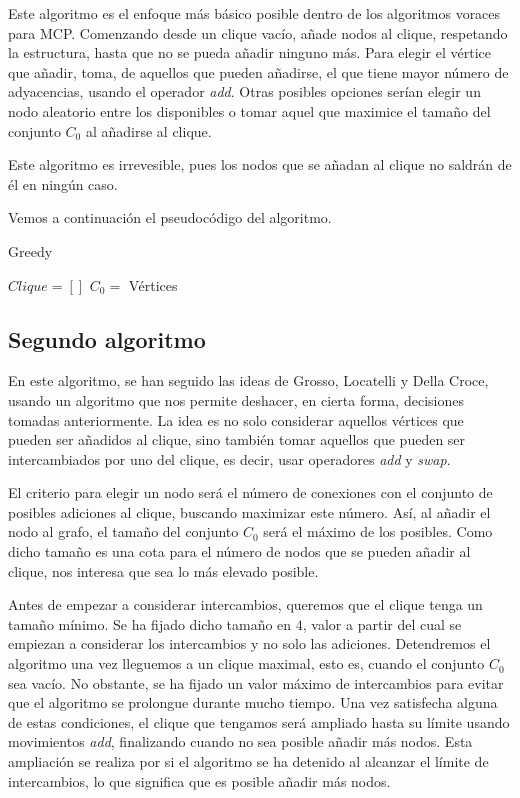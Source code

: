 Este algoritmo es el enfoque más básico posible dentro de los algoritmos voraces para MCP.
Comenzando desde un clique vacío, añade nodos al clique, respetando la estructura, hasta
que no se pueda añadir ninguno más. Para elegir el vértice que añadir, toma, de aquellos que
pueden añadirse, el que tiene mayor número de adyacencias, usando el operador \textit{add}.
Otras posibles opciones serían elegir un nodo aleatorio entre los disponibles o tomar aquel que
maximice el tamaño del conjunto $C_0$ al añadirse al clique.

Este algoritmo es irrevesible, pues los nodos que se añadan al clique no saldrán de él
en ningún caso.

Vemos a continuación el pseudocódigo del algoritmo.

\begin{algorithm}[H]
\caption{Greedy}
  \begin{algorithmic}
  \State $Clique = [ ]$
  \State $C_0 = $ Vértices
  \Repeat
  \end{algorithmic}
\end{algorithm}


\subsection{Segundo algoritmo}

En este algoritmo, se han seguido las ideas de Grosso, Locatelli y Della Croce, usando un algoritmo
que nos permite deshacer, en cierta forma, decisiones tomadas anteriormente. La idea es no solo
considerar aquellos vértices que pueden ser añadidos al clique, sino también tomar aquellos que
pueden ser intercambiados por uno del clique, es decir, usar operadores \textit{add} y \textit{swap}.

El criterio para elegir un nodo será el número de conexiones con el conjunto de posibles adiciones
al clique, buscando maximizar este número. Así, al añadir el nodo al grafo, el tamaño del conjunto
$C_0$ será el máximo de los posibles. Como dicho tamaño es una cota para el número de nodos que se
pueden añadir al clique, nos interesa que sea lo más elevado posible.

Antes de empezar a considerar intercambios, queremos que el clique tenga un tamaño mínimo.
Se ha fijado dicho tamaño en $4$, valor a partir del cual se empiezan a considerar los
intercambios y no solo las adiciones. Detendremos el algoritmo una vez lleguemos a un
clique maximal, esto es, cuando el conjunto $C_0$ sea vacío. No obstante, se ha fijado
un valor máximo de intercambios para evitar que el algoritmo se prolongue durante mucho tiempo.
Una vez satisfecha alguna de estas condiciones, el clique que tengamos será ampliado
hasta su límite usando movimientos \textit{add}, finalizando cuando no sea posible
añadir más nodos. Esta ampliación se realiza por si el algoritmo se ha detenido al
alcanzar el límite de intercambios, lo que significa que es posible añadir más nodos.

